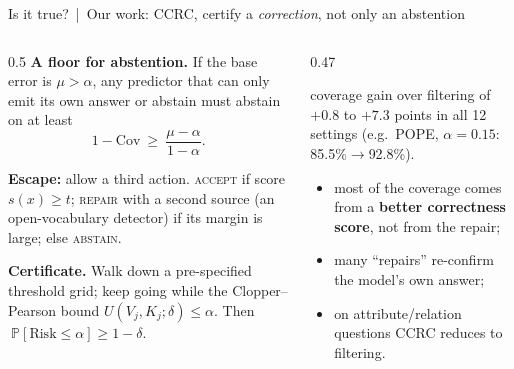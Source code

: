 \documentclass[aspectratio=169,10pt]{beamer}
\begin{document}
\begin{frame}{Is it true? \,|\, Our work: CCRC, certify a \emph{correction}, not only an abstention}
\begin{columns}[T]
\begin{column}{0.5\textwidth}
{\footnotesize\textbf{A floor for abstention.} If the base error is \(\mu>\alpha\), any predictor that can only emit its own answer or abstain must abstain on at least}
\[1-\mathrm{Cov}\ \ge\ \frac{\mu-\alpha}{1-\alpha}.\]
{\footnotesize\textbf{Escape:} allow a third action. \textsc{accept} if score \(s(x)\ge t\); \textsc{repair} with a second source (an open-vocabulary detector) if its margin is large; else \textsc{abstain}.

\vspace{1mm}
\textbf{Certificate.} Walk down a pre-specified threshold grid; keep going while the Clopper--Pearson bound \(U(V_j,K_j;\delta)\le\alpha\). Then \(\ \mathbb P[\mathrm{Risk}\le\alpha]\ge1-\delta\).}
\end{column}
\begin{column}{0.47\textwidth}
{\footnotesize{} coverage gain over filtering of \(+0.8\) to \(+7.3\) points in all 12 settings (e.g.\ POPE, \(\alpha=0.15\): 85.5\%\(\to\)92.8\%).

\vspace{2mm}
\begin{itemize}\setlength\itemsep{1pt}
\item most of the coverage comes from a \textbf{better correctness score}, not from the repair;
\item many ``repairs'' re-confirm the model's own answer;
\item on attribute/relation questions CCRC reduces to filtering.
\end{itemize}}

\end{column}
\end{columns}
\end{frame}
\end{document}
